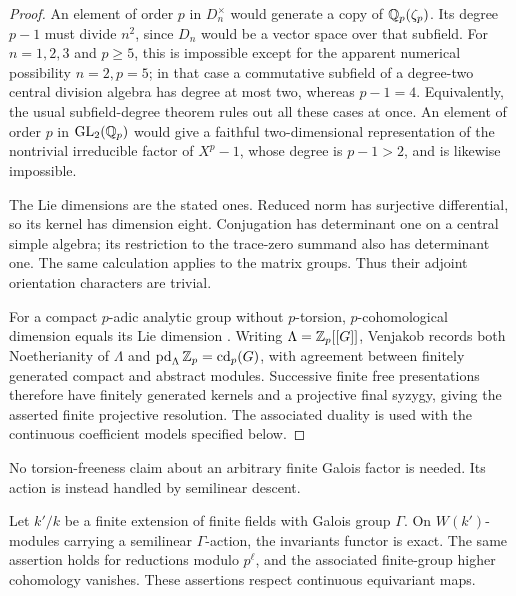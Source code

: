 \begin{proof}
An element of order \(p\) in \(D_n^\times\) would generate a copy of
\(\mathbb Q_p(\zeta_p)\). Its degree \(p-1\) must divide \(n^2\), since
\(D_n\) would be a vector space over that subfield. For \(n=1,2,3\)
and \(p\geq5\), this is impossible except for the apparent numerical
possibility \(n=2,p=5\); in that case a commutative subfield of a
degree-two central division algebra has degree at most two, whereas
\(p-1=4\). Equivalently, the usual subfield-degree theorem rules out
all these cases at once. An element of order \(p\) in
\(\operatorname{GL}_2(\mathbb Q_p)\) would give a faithful two-dimensional representation
of the nontrivial irreducible factor of \(X^p-1\), whose degree is
\(p-1>2\), and is likewise impossible.

The Lie dimensions are the stated ones. Reduced norm has surjective
differential, so its kernel has dimension eight. Conjugation has
determinant one on a central simple algebra; its restriction to the
trace-zero summand also has determinant one. The same calculation
applies to the matrix groups. Thus their adjoint orientation
characters are trivial.

For a compact \(p\)-adic analytic group without \(p\)-torsion,
\(p\)-cohomological dimension equals its Lie dimension
\cite[Section~1, Corollary~(1)]{Serre1965CohomologicalDimension}.
Writing \(\Lambda=\mathbb Z_p[[G]]\), Venjakob
\cite[pp.~275--276]{Venjakob} records both Noetherianity of \(\Lambda\)
and \(\operatorname{pd}_{\Lambda}\mathbb Z_p=\operatorname{cd}_p(G)\),
with agreement between finitely generated compact and abstract
modules.  Successive finite free presentations therefore have finitely
generated kernels and a projective final syzygy, giving the asserted
finite projective resolution. The associated duality is used with the
continuous coefficient models specified below.
\end{proof}

No torsion-freeness claim about an arbitrary finite Galois factor is
needed. Its action is instead handled by semilinear descent.

\begin{lemma}\label{h3:lem:framework-semilinear}
Let \(k'/k\) be a finite extension of finite fields with Galois group
\(\Gamma\). On \(W(k')\)-modules carrying a semilinear \(\Gamma\)-action,
the invariants functor is exact. The same assertion holds for reductions
modulo \(p^\ell\), and the associated finite-group higher cohomology
vanishes. These assertions respect continuous equivariant maps.
\end{lemma}


